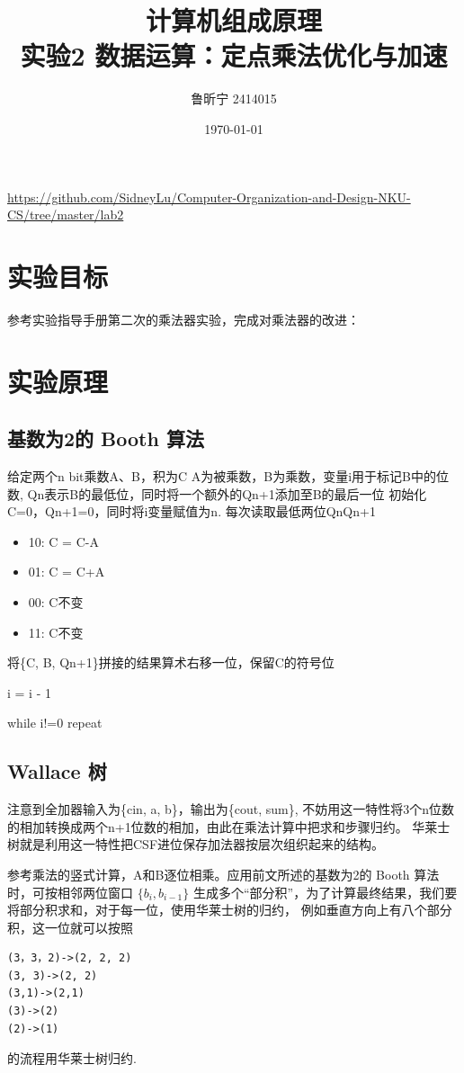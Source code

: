 \documentclass{article}
\title{计算机组成原理 \\ 实验2 数据运算：定点乘法优化与加速}
\author{鲁昕宁 2414015}
\date{\today}
\begin{document}
\maketitle
\begin{center}
    \url{https://github.com/SidneyLu/Computer-Organization-and-Design-NKU-CS/tree/master/lab2}
\end{center}

\newpage

\section{实验目标}
参考实验指导手册第二次的乘法器实验，完成对乘法器的改进：

\section{实验原理}
\subsection{基数为2的 Booth 算法}
给定两个n bit乘数A、B，积为C
A为被乘数，B为乘数，变量i用于标记B中的位数,
Qn表示B的最低位，同时将一个额外的Qn+1添加至B的最后一位
初始化C=0，Qn+1=0，同时将i变量赋值为n.
每次读取最低两位QnQn+1
\begin{itemize}
    \item 10: C = C-A
    \item 01: C = C+A
    \item 00: C不变
    \item 11: C不变
\end{itemize}
将\{C, B, Qn+1\}拼接的结果算术右移一位，保留C的符号位

i = i - 1

while i!=0 repeat
\subsection{Wallace 树}
注意到全加器输入为\{cin, a, b\}，输出为\{cout, sum\}, 不妨用这一特性将3个n位数的相加转换成两个n+1位数的相加，由此在乘法计算中把求和步骤归约。
华莱士树就是利用这一特性把CSF进位保存加法器按层次组织起来的结构。

参考乘法的竖式计算，A和B逐位相乘。应用前文所述的基数为2的 Booth 算法时，可按相邻两位窗口 \(\{b_i,b_{i-1}\}\) 生成多个“部分积”，为了计算最终结果，我们要将部分积求和，对于每一位，使用华莱士树的归约，
例如垂直方向上有八个部分积，这一位就可以按照
\begin{verbatim}
(3，3，2)->(2, 2, 2)
(3, 3)->(2, 2)
(3,1)->(2,1)
(3)->(2)
(2)->(1)
\end{verbatim}
的流程用华莱士树归约.
\end{document}
